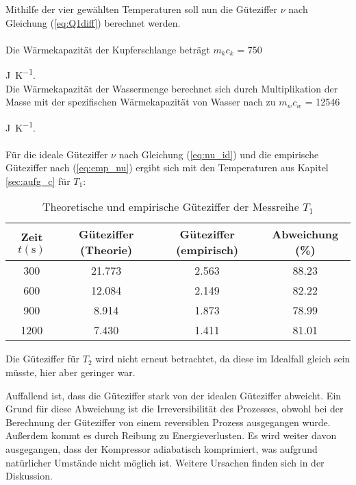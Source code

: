 Mithilfe der vier gewählten Temperaturen soll nun die Güteziffer $\nu$ nach Gleichung 
(\ref{eq:Q1diff}) berechnet werden. \\
\\
Die Wärmekapazität der Kupferschlange beträgt $m_{k} c_{k}$ = 750 {\unit[per-mode=fraction]{\joule\per\kelvin}. \\
Die Wärmekapazität der Wassermenge berechnet sich durch Multiplikation der Masse mit der spezifischen
Wärmekapazität von Wasser nach \cite[278]{demtroeder1} zu $m_{w} c_{w}$ = 12546 {\unit[per-mode=fraction]{\joule\per\kelvin}. \\
\\
Für die ideale Güteziffer $\nu$ nach Gleichung (\ref{eq:nu_id}) und die empirische Güteziffer nach (\ref{eq:emp_nu})
ergibt sich mit den Temperaturen aus Kapitel \ref{sec:aufg_c} für $T_{1}$:

\begin{table}
  \centering
  \caption{Theoretische und empirische Güteziffer der Messreihe $T_{1}$}
  \label{tab:güteziffern_t1}
  \begin{tabular}{c c c c}
    \toprule
    {Zeit $t (\unit{\second})$} &
    Güteziffer (Theorie) &
    Güteziffer (empirisch) &
    Abweichung (\%) \\
    \midrule
         300 &                21.773 &                   2.563 &           88.23 \\
         600 &                12.084 &                   2.149 &           82.22 \\
         900 &                 8.914 &                   1.873 &           78.99 \\
        1200 &                 7.430 &                   1.411 &           81.01 \\
    \bottomrule
    \end{tabular}
\end{table}

Die Güteziffer für $T_{2}$ wird nicht erneut betrachtet, da diese im Idealfall gleich sein
müsste, hier aber geringer war.

Auffallend ist, dass die Güteziffer stark von der idealen Güteziffer abweicht. Ein Grund für diese
Abweichung ist die Irreversibilität des Prozesses, obwohl bei der Berechnung der Güteziffer von
einem reversiblen Prozess ausgegangen wurde. Außerdem kommt es durch Reibung zu Energieverlusten.
Es wird weiter davon ausgegangen, dass der Kompressor adiabatisch komprimiert, was aufgrund natürlicher
Umstände nicht möglich ist. Weitere Ursachen finden sich in der Diskussion.

}}
